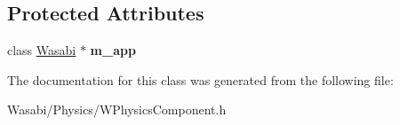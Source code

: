 \subsection*{Protected Attributes}
\begin{DoxyCompactItemize}
\item 
class \hyperlink{class_wasabi}{Wasabi} $\ast$ {\bfseries m\+\_\+app}\hypertarget{class_w_physics_component_abbd7b6b074bacabd9185f442994e7b06}{}\label{class_w_physics_component_abbd7b6b074bacabd9185f442994e7b06}

\end{DoxyCompactItemize}


The documentation for this class was generated from the following file\+:\begin{DoxyCompactItemize}
\item 
Wasabi/\+Physics/W\+Physics\+Component.\+h\end{DoxyCompactItemize}
